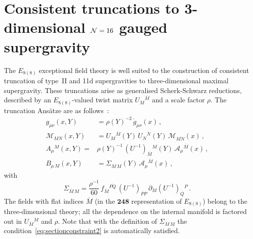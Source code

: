 \documentclass[a4paper, 11pt]{article}
\numberwithin{equation}{section}
\newcommand{\ov}[1]{\overline{#1}}
\newcommand{\EE}{\ensuremath{E_{8(8)}}\xspace}
\newcommand{\+}{\oplus}
\newcommand{\UI}{\left(U^{-1}\right)}
\newcommand{\fl}[1]{\ov{#1}}
\newcommand{\M}{\ensuremath{\mathcal{M}}\xspace}
\newcommand{\A}{\ensuremath{\mathcal{A}}\xspace}
\begin{document}
\section{Consistent truncations to 3-dimensional \texorpdfstring{${\cal N}=16$}{N=16} gauged supergravity} \label{s:TruncationReview}
The \EE exceptional field theory is well suited to the construction of consistent truncation of type~II and 11d supergravities to three-dimensional maximal supergravity. These truncations arise as generalised Scherk-Schwarz reductions, described by an \EE-valued twist matrix $U_{M}{}^{\fl{M}}$ and a scale factor $\rho$. The truncation Ansätze are as follows~\cite{Galli:2022idq}:
\begin{equation} \label{eq:GSSansatz}
	\begin{aligned}
		g_{\mu\nu}(x,Y)&=\rho(Y)^{-2}\,\mathring{g}_{\mu\nu}(x)\,,\\
		\M_{MN}(x,Y)&=U_{M}{}^{\fl{M}}(Y)\,U_{N}{}^{\fl{N}}(Y)\,\M_{\fl{MN}}(x)\,,\\
		A_{\mu}{}^{M}(x,Y)=&\rho(Y)^{-1}\,\UI_{\fl{M}}{}^{M}(Y)\,\A_{\mu}{}^{\fl{M}}(x)\,,\\
		B_{\mu\,M}(x,Y)&=\Sigma_{\fl{M}\,M}(Y)\,\A_{\mu}{}^{\fl{M}}(x)\,,
	\end{aligned}
\end{equation}
with
\begin{equation}
	\Sigma_{\fl{M}\,M}=\frac{\rho^{-1}}{60}\,f_{\fl{M}}{}^{\fl{PQ}}\,\UI_{\fl{P}P}\,\partial_{M}\UI_{\fl{Q}}{}^{P}\,.
\end{equation}
The fields with flat indices $\fl{M}$ (in the $\mathbf{248}$ representation of \EE) belong to the three-dimensional theory; all the dependence on the internal manifold is factored out in $U_{\fl{M}}{}^{M}$ and $\rho$. Note that with the definition of $\Sigma_{\fl{M}\,M}$ the condition~\eqref{eq:sectionconstraint2} is automatically satisfied.
\end{document}
